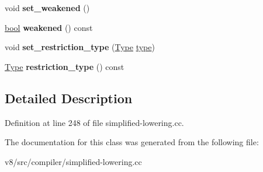 \begin{DoxyCompactItemize}
\item 
\mbox{\label{classv8_1_1internal_1_1compiler_1_1RepresentationSelector_1_1NodeInfo_ad8c9aeb72a8a16923b87a96b687f7d6d}} 
void {\bfseries set\+\_\+weakened} ()
\item 
\mbox{\label{classv8_1_1internal_1_1compiler_1_1RepresentationSelector_1_1NodeInfo_a8b1b770c376f27cd14b8ba169a06402f}} 
\mbox{\hyperlink{classbool}{bool}} {\bfseries weakened} () const
\item 
\mbox{\label{classv8_1_1internal_1_1compiler_1_1RepresentationSelector_1_1NodeInfo_aa1bc841c4b86898434f36a81cc9a314d}} 
void {\bfseries set\+\_\+restriction\+\_\+type} (\mbox{\hyperlink{classv8_1_1internal_1_1compiler_1_1Type}{Type}} \mbox{\hyperlink{classstd_1_1conditional_1_1type}{type}})
\item 
\mbox{\label{classv8_1_1internal_1_1compiler_1_1RepresentationSelector_1_1NodeInfo_ad8c6f8fe43955dc27687df081fc9635f}} 
\mbox{\hyperlink{classv8_1_1internal_1_1compiler_1_1Type}{Type}} {\bfseries restriction\+\_\+type} () const
\end{DoxyCompactItemize}


\subsection{Detailed Description}


Definition at line 248 of file simplified-\/lowering.\+cc.



The documentation for this class was generated from the following file\+:\begin{DoxyCompactItemize}
\item 
v8/src/compiler/simplified-\/lowering.\+cc\end{DoxyCompactItemize}
